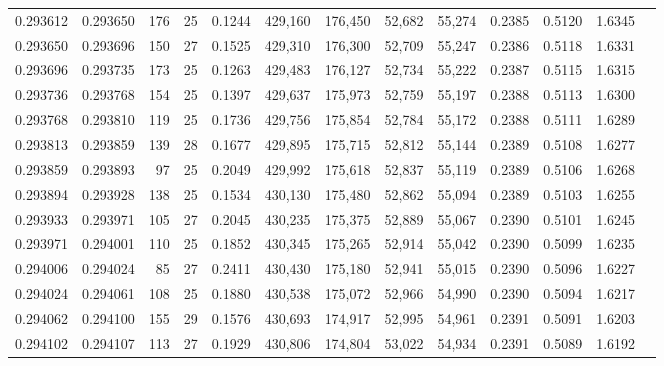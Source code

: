 \begin{tabular}{rrrrrrrrrrrrr}
0.293612 & 0.293650 &   176 &  25 &                                     0.1244 & 429,160 & 176,450 &  52,682 &  55,274 & 0.2385 & 0.5120 & 1.6345 \\
0.293650 & 0.293696 &   150 &  27 &                                     0.1525 & 429,310 & 176,300 &  52,709 &  55,247 & 0.2386 & 0.5118 & 1.6331 \\
0.293696 & 0.293735 &   173 &  25 &                                     0.1263 & 429,483 & 176,127 &  52,734 &  55,222 & 0.2387 & 0.5115 & 1.6315 \\
0.293736 & 0.293768 &   154 &  25 &                                     0.1397 & 429,637 & 175,973 &  52,759 &  55,197 & 0.2388 & 0.5113 & 1.6300 \\
0.293768 & 0.293810 &   119 &  25 &                                     0.1736 & 429,756 & 175,854 &  52,784 &  55,172 & 0.2388 & 0.5111 & 1.6289 \\
0.293813 & 0.293859 &   139 &  28 &                                     0.1677 & 429,895 & 175,715 &  52,812 &  55,144 & 0.2389 & 0.5108 & 1.6277 \\
0.293859 & 0.293893 &    97 &  25 &                                     0.2049 & 429,992 & 175,618 &  52,837 &  55,119 & 0.2389 & 0.5106 & 1.6268 \\
0.293894 & 0.293928 &   138 &  25 &                                     0.1534 & 430,130 & 175,480 &  52,862 &  55,094 & 0.2389 & 0.5103 & 1.6255 \\
0.293933 & 0.293971 &   105 &  27 &                                     0.2045 & 430,235 & 175,375 &  52,889 &  55,067 & 0.2390 & 0.5101 & 1.6245 \\
0.293971 & 0.294001 &   110 &  25 &                                     0.1852 & 430,345 & 175,265 &  52,914 &  55,042 & 0.2390 & 0.5099 & 1.6235 \\
0.294006 & 0.294024 &    85 &  27 &                                     0.2411 & 430,430 & 175,180 &  52,941 &  55,015 & 0.2390 & 0.5096 & 1.6227 \\
0.294024 & 0.294061 &   108 &  25 &                                     0.1880 & 430,538 & 175,072 &  52,966 &  54,990 & 0.2390 & 0.5094 & 1.6217 \\
0.294062 & 0.294100 &   155 &  29 &                                     0.1576 & 430,693 & 174,917 &  52,995 &  54,961 & 0.2391 & 0.5091 & 1.6203 \\
0.294102 & 0.294107 &   113 &  27 &                                     0.1929 & 430,806 & 174,804 &  53,022 &  54,934 & 0.2391 & 0.5089 & 1.6192 \\

\end{tabular}
